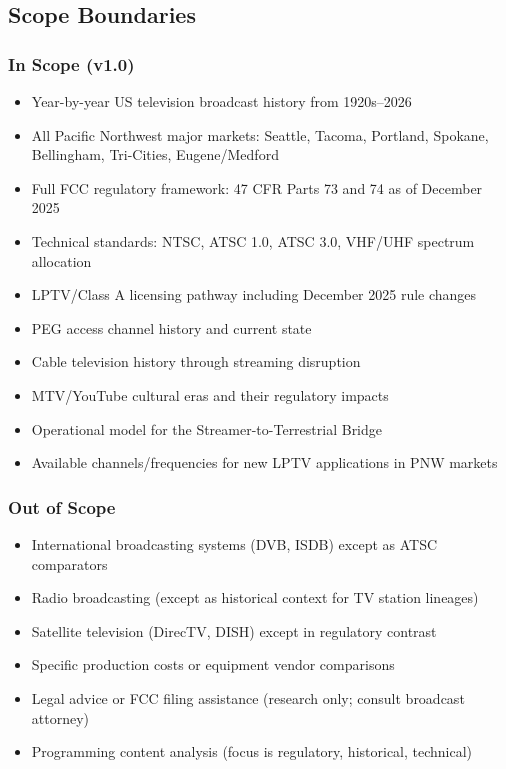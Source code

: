 \documentclass[11pt,letterpaper]{article}
\begin{document}
\subsection{Scope Boundaries}

\subsubsection{In Scope (v1.0)}
\begin{itemize}[leftmargin=2em]
  \item Year-by-year US television broadcast history from 1920s--2026
  \item All Pacific Northwest major markets: Seattle, Tacoma, Portland, Spokane, Bellingham, Tri-Cities, Eugene/Medford
  \item Full FCC regulatory framework: 47 CFR Parts 73 and 74 as of December 2025
  \item Technical standards: NTSC, ATSC 1.0, ATSC 3.0, VHF/UHF spectrum allocation
  \item LPTV/Class A licensing pathway including December 2025 rule changes
  \item PEG access channel history and current state
  \item Cable television history through streaming disruption
  \item MTV/YouTube cultural eras and their regulatory impacts
  \item Operational model for the Streamer-to-Terrestrial Bridge
  \item Available channels/frequencies for new LPTV applications in PNW markets
\end{itemize}

\subsubsection{Out of Scope}
\begin{itemize}[leftmargin=2em]
  \item International broadcasting systems (DVB, ISDB) except as ATSC comparators
  \item Radio broadcasting (except as historical context for TV station lineages)
  \item Satellite television (DirecTV, DISH) except in regulatory contrast
  \item Specific production costs or equipment vendor comparisons
  \item Legal advice or FCC filing assistance (research only; consult broadcast attorney)
  \item Programming content analysis (focus is regulatory, historical, technical)
\end{itemize}
\end{document}
